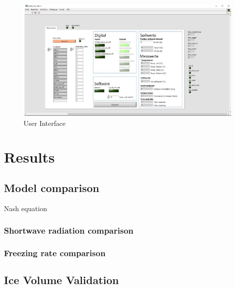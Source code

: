 \documentclass[utf8]{frontiersSCNS}
\begin{document}
\begin{figure}[ht]
	\begin{center}
		\includegraphics[width=\linewidth]{Figures/user_interface.png}
	\end{center}
  \caption{User Interface}
	\label{fig:UI}
\end{figure}



\section{Results}
\subsection{Model comparison}
Nash equation

\subsubsection{Shortwave radiation comparison}

\subsubsection{Freezing rate comparison}

\subsection{Ice Volume Validation}
\end{document}
